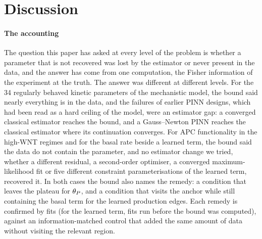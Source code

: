 \section{Discussion}
\label{sec:discussion}

\paragraph{The accounting} The question this paper has asked at every level of
the problem is whether a parameter that is not recovered was lost by the
estimator or never present in the data, and the answer has come from one
computation, the Fisher information of the experiment at the truth. The answer
was different at different levels. For the 34 regularly behaved kinetic
parameters of the mechanistic model, the bound said nearly everything is in the
data, and the failures of earlier PINN designs, which had been read as a hard
ceiling of the model, were an estimator gap: a converged classical estimator
reaches the bound, and a Gauss--Newton PINN reaches the classical estimator
where its continuation converges. For APC functionality in the high-WNT
regimes and for the basal rate beside a learned term, the bound said the data
do not contain the parameter, and no estimator change we tried, whether a
different residual, a second-order optimiser, a converged maximum-likelihood
fit or five different constraint parameterisations of the learned term, recovered it. In
both cases the bound also names the remedy: a condition that leaves the \bcat{}
plateau for $\theta_P$, and a condition that visits the anchor while still
containing the basal term for the learned production edges. Each remedy is
confirmed by fits (for the learned term, fits run before the bound was
computed), against an information-matched control that added the same amount of data without visiting
the relevant region.

